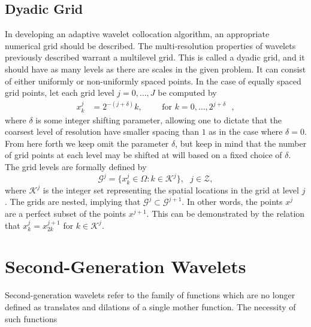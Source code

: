 \documentclass[11pt]{article}
\begin{document}
\subsection{Dyadic Grid}
In developing an adaptive wavelet collocation algorithm, an appropriate numerical grid should be described. The 
multi-resolution properties of wavelets previously described warrant a multilevel grid. This 
is called a dyadic grid, and it should have as many levels as there are scales in the given problem. It can consist of 
either uniformly or non-uniformly spaced points. In the case of equally spaced grid points, 
let each grid level $j = 0, \dots, J$ be computed by 
\begin{align}
x^{j}_{k} &= 2^{-(j+\delta)} k,\text{ } \text{ } \text{ }  \text{ for $k=0,\dots,2^{j+\delta}$ },
\end{align}
where $\delta$ is some integer shifting parameter, allowing one to dictate that the coarsest level of resolution have 
smaller spacing than $1$ as in the case where $\delta=0$. From here forth we keep omit the parameter $\delta$, but keep
in mind that the number of grid points at each level may be shifted at will based on a fixed choice of $\delta$. 
The grid levels are formally defined by 
\begin{equation}
    \mathcal{G}^j= \{ x_{k}^{j} \in \Omega : k \in \mathcal{K}^j \}, \text{ } j \in \mathcal{Z},
\end{equation}
where $\mathcal{K}^{j}$ is the integer set representing the spatial locations in the grid at level $j$. The grids are 
nested, implying that $\mathcal{G}^{j} \subset \mathcal{G}^{j+1}$. In other words, the points $x^{j}$ are a perfect 
subset of the points $x^{j+1}$. This can be demonstrated by the relation that 
$x_{k}^{j}=x_{2k}^{j+1}$ for $k \in \mathcal{K}^{j}$.

\section{Second-Generation Wavelets}
Second-generation wavelets refer to the family of functions which are no longer defined as translates and dilations of 
a single mother function. The necessity of such functions 
\end{document}

